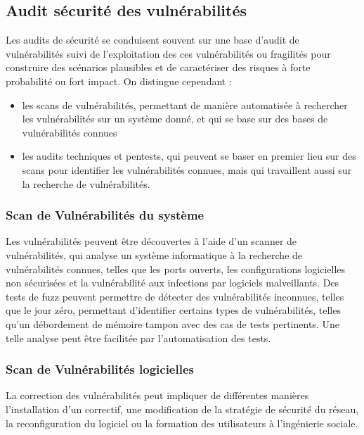 \subsection{Audit sécurité des vulnérabilités}

Les audits de sécurité se conduisent souvent sur une base d'audit de vulnérabilités suivi de l'exploitation des ces vulnérabilités ou fragilités pour construire des scénarios plausibles et de caractériser des risques à forte probabilité ou fort impact.
On distingue cependant :
\begin{itemize}
	\item les scans de vulnérabilités, permettant de manière automatisée à rechercher les vulnérabilités sur un système donné, et qui se base sur des bases de vulnérabilités connues
	\item les audits techniques et pentests, qui peuvent se baser en premier lieu sur des scans pour identifier les vulnérabilités connues, mais qui travaillent aussi sur la recherche de vulnérabilités.
\end{itemize}

\subsubsection{Scan de Vulnérabilités du système}

Les vulnérabilités peuvent être découvertes à l'aide d'un scanner de vulnérabilités, qui analyse un système informatique à la recherche de vulnérabilités connues, telles que les ports ouverts, les configurations logicielles non sécurisées et la vulnérabilité aux infections par logiciels malveillants. Des tests de fuzz peuvent permettre de détecter des vulnérabilités inconnues, telles que le jour zéro, permettant d'identifier certains types de vulnérabilités, telles qu'un débordement de mémoire tampon avec des cas de tests pertinents. Une telle analyse peut être facilitée par l’automatisation des tests. 



\subsubsection{Scan de Vulnérabilités logicielles}

La correction des vulnérabilités peut impliquer de différentes manières l’installation d’un correctif, une modification de la stratégie de sécurité du réseau, la reconfiguration du logiciel ou la formation des utilisateurs à l’ingénierie sociale.


